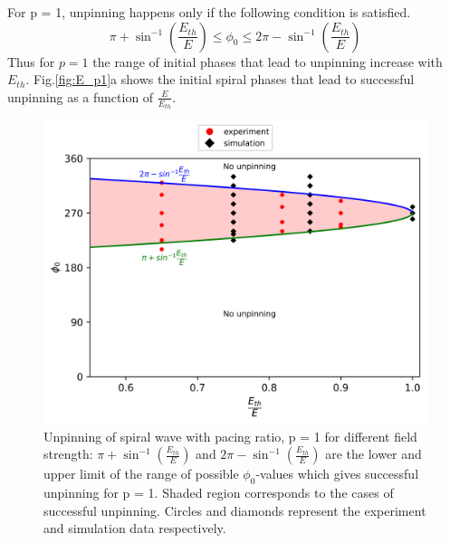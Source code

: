 For p = 1, unpinning happens only if the following condition is satisfied.
\begin{equation}
\pi+ \sin^{-1}(\frac{E_{th}}{E})  \leq \phi_0 \leq 2\pi-\sin^{-1}(\frac{E_{th}}{E})
\label{eq:p=1}
\end{equation} 
Thus for $p=1$ the range of initial phases that lead to
unpinning increase with $E_{th}$. Fig.\ref{fig:E_p1}a shows the initial spiral
phases that lead to successful unpinning as a function of $\frac{E}{E_{th}}$.


%
\begin{figure}[htb!]
    \centering
	\includegraphics[width=\columnwidth]{p1.png}
    \caption{Unpinning of spiral wave with pacing ratio, p = 1 for different
	field strength: $\pi+{\sin^{-1}}{(\frac{E_{th}}{E})}$ and
	$2\pi-{\sin^{-1}}{(\frac{E_{th}}{E})}$ are the lower and upper limit of
	the range of possible ${\phi}_0$-values which gives successful
	unpinning for p = 1. Shaded region corresponds to the cases of
	successful unpinning.
    Circles and diamonds represent the experiment and simulation data
	respectively.} 
	\label{fig:unpinning_p1}
\end{figure}




